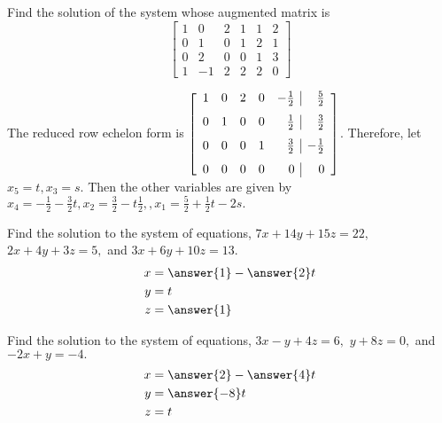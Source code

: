 \documentclass{ximera}
\begin{document}
\begin{problem}\label{prb:2.29} Find the solution of the system whose augmented matrix is
\begin{equation*}
\left[
\begin{array}{rrrrr|r}
1 & 0 & 2 & 1 & 1 & 2 \\
0 & 1 & 0 & 1 & 2 & 1 \\
0 & 2 & 0 & 0 & 1 & 3 \\
1 & -1 & 2 & 2 & 2 & 0
\end{array}
\right]
\end{equation*}
\begin{hint}
The reduced row echelon form is $\left[
\begin{array}{rrrrr|r}
1 & 0 & 2 & 0 & -\vspace{0.05in}\frac{1}{2} & \vspace{0.05in}\frac{5}{2} \\
0 & 1 & 0 & 0 & \vspace{0.05in}\frac{1}{2} & \vspace{0.05in}\frac{3}{2} \\
0 & 0 & 0 & 1 & \vspace{0.05in}\frac{3}{2} & -\vspace{0.05in}\frac{1}{2} \\
0 & 0 & 0 & 0 & 0 & 0
\end{array}
\right] $. Therefore, let $x_{5}=t,x_{3}=s.$ Then the other variables are
given by $x_{4}=-\frac{1}{2}-\frac{3}{2}t,x_{2}=\frac{3}{2}-t\frac{1}{2}
,,x_{1}=\frac{5}{2}+\frac{1}{2}t-2s.$
\end{hint}
\end{problem}

\begin{problem}\label{prb:2.30} Find the solution to the system of equations, $7x+14y+15z=22,
$ $2x+4y+3z=5,$ and $3x+6y+10z=13.$
 \begin{align*}
 x&=\answer{1}-\answer{2}t\\
 y&=t\\
 z&=\answer{1}\\
 \end{align*}
\end{problem}

\begin{problem}\label{prb:2.31} Find the solution to the system of equations, $3x-y+4z=6,$
$y+8z=0,$ and $-2x+y=-4.$
 \begin{align*}
 x&=\answer{2}-\answer{4}t\\
 y&=\answer{-8}t\\
 z&=t\\
 \end{align*}
\end{problem}
\end{document}
